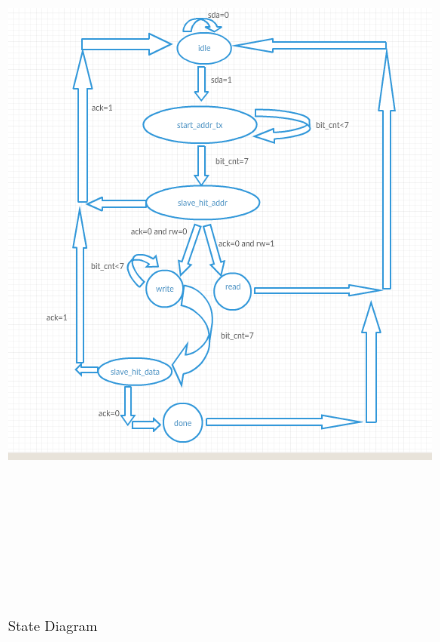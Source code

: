 \documentclass[12pt,twocolumn]{IEEEtran}
\begin{document}
    \begin{figure}[p]
    \includegraphics[width=1.6\linewidth, height=20cm]{I2C_State_diagram.png}
    \caption{State Diagram}
    \end{figure}
\end{document}
